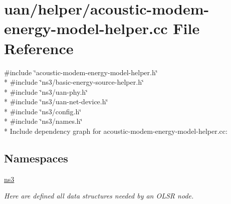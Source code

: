 \hypertarget{acoustic-modem-energy-model-helper_8cc}{}\section{uan/helper/acoustic-\/modem-\/energy-\/model-\/helper.cc File Reference}
\label{acoustic-modem-energy-model-helper_8cc}
{\ttfamily \#include \char`\"{}acoustic-\/modem-\/energy-\/model-\/helper.\+h\char`\"{}}\\*
{\ttfamily \#include \char`\"{}ns3/basic-\/energy-\/source-\/helper.\+h\char`\"{}}\\*
{\ttfamily \#include \char`\"{}ns3/uan-\/phy.\+h\char`\"{}}\\*
{\ttfamily \#include \char`\"{}ns3/uan-\/net-\/device.\+h\char`\"{}}\\*
{\ttfamily \#include \char`\"{}ns3/config.\+h\char`\"{}}\\*
{\ttfamily \#include \char`\"{}ns3/names.\+h\char`\"{}}\\*
Include dependency graph for acoustic-\/modem-\/energy-\/model-\/helper.cc\+:
\subsection*{Namespaces}
\begin{DoxyCompactItemize}
\item 
 \hyperlink{namespacens3}{ns3}
\begin{DoxyCompactList}\small\item\em Here are defined all data structures needed by an O\+L\+SR node. \end{DoxyCompactList}\end{DoxyCompactItemize}
